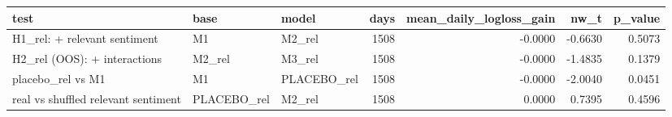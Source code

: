 \begin{tabular}{lllrrrr}
\toprule
test & base & model & days & mean\_daily\_logloss\_gain & nw\_t & p\_value \\
\midrule
H1\_rel: + relevant sentiment & M1 & M2\_rel & 1508 & -0.0000 & -0.6630 & 0.5073 \\
H2\_rel (OOS): + interactions & M2\_rel & M3\_rel & 1508 & -0.0000 & -1.4835 & 0.1379 \\
placebo\_rel vs M1 & M1 & PLACEBO\_rel & 1508 & -0.0000 & -2.0040 & 0.0451 \\
real vs shuffled relevant sentiment & PLACEBO\_rel & M2\_rel & 1508 & 0.0000 & 0.7395 & 0.4596 \\
\bottomrule
\end{tabular}
